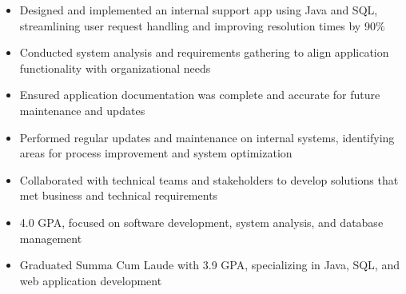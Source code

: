 \par\smallskip
\noindent
\begin{minipage}{20cm}
  \begin{minipage}{9.75cm}
    \begin{itemize}
      \item Designed and implemented an internal support app using Java and SQL, streamlining user request handling and improving resolution times by 90\%
      \item Conducted system analysis and requirements gathering to align application functionality with organizational needs
      \item Ensured application documentation was complete and accurate for future maintenance and updates
    \end{itemize}
  \end{minipage}
  \hfill
  \begin{minipage}{9.75cm}
    \begin{itemize}
      \item Performed regular updates and maintenance on internal systems, identifying areas for process improvement and system optimization
      \item Collaborated with technical teams and stakeholders to develop solutions that met business and technical requirements
    \end{itemize}
  \end{minipage}
\end{minipage}

\begin{itemize}
  \item 4.0 GPA, focused on software development, system analysis, and database management
\end{itemize}
\divider

\begin{itemize}
  \item Graduated Summa Cum Laude with 3.9 GPA, specializing in Java, SQL, and web application development
\end{itemize}

\noindent
\begin{minipage}{20cm}
\end{minipage}


